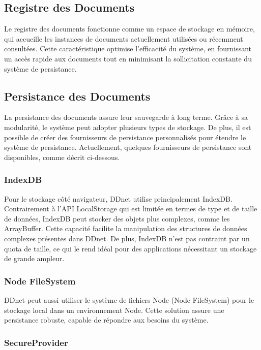\subsection{Registre des Documents}

Le registre des documents fonctionne comme un espace de stockage en mémoire, qui accueille les instances de documents actuellement utilisées ou récemment consultées. Cette caractéristique optimise l'efficacité du système, en fournissant un accès rapide aux documents tout en minimisant la sollicitation constante du système de persistance.

\subsection{Persistance des Documents}

La persistance des documents assure leur sauvegarde à long terme. Grâce à sa modularité, le système peut adopter plusieurs types de stockage. De plus, il est possible de créer des fournisseurs de persistance personnalisés pour étendre le système de persistance. Actuellement, quelques fournisseurs de persistance sont disponibles, comme décrit ci-dessous.

\subsubsection{IndexDB}

Pour le stockage côté navigateur, \Gls{DDnet} utilise principalement IndexDB. Contrairement à l'API LocalStorage qui est limitée en termes de type et de taille de données, IndexDB peut stocker des objets plus complexes, comme les ArrayBuffer. Cette capacité facilite la manipulation des structures de données complexes présentes dans \Gls{DDnet}. De plus, IndexDB n'est pas contraint par un quota de taille, ce qui le rend idéal pour des applications nécessitant un stockage de grande ampleur.

\subsubsection{Node FileSystem}

\Gls{DDnet} peut aussi utiliser le système de fichiers Node (Node FileSystem) pour le stockage local dans un environnement Node. Cette solution assure une persistance robuste, capable de répondre aux besoins du système.

\subsubsection{SecureProvider}

